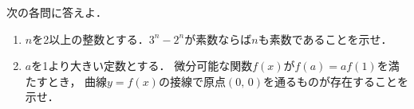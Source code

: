 \documentclass[../../main.tex]{subfiles}
\begin{document}
次の各問に答えよ．
\begin{enumerate}
  \item[問1]$n$を2以上の整数とする．$3^n-2^n$が素数ならば$n$も素数であることを示せ．
  \item[問2]$a$を1より大きい定数とする．
    微分可能な関数$f(x)$が$f(a)=af(1)$を満たすとき，
    曲線$y=f(x)$の接線で原点$(0, \, 0)$を通るものが存在することを示せ．
\end{enumerate}
\end{document}
